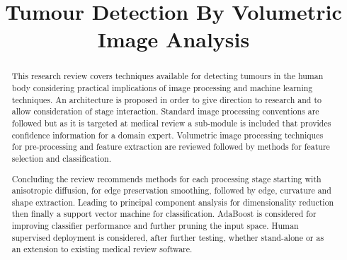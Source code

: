 \documentclass[journal]{IEEEtran}
\begin{document}
\title{Tumour Detection By Volumetric Image Analysis}
\author{
}


{}

\maketitle





\begin{abstract}

This research review covers techniques available for detecting tumours in the human body considering practical implications of image processing and machine learning techniques.   
An architecture is proposed in order to give direction to research and to allow consideration of stage interaction.
Standard image processing conventions are followed but as it is targeted at medical review a sub-module is included that provides confidence information for a domain expert.  
Volumetric image processing techniques for pre-processing and feature extraction are reviewed followed by methods for feature selection and classification. 
 

Concluding the review recommends methods for each processing stage starting with anisotropic diffusion, for edge preservation smoothing, followed by edge, curvature and shape extraction.
Leading to principal component analysis for dimensionality reduction then finally a support vector machine for classification.
AdaBoost is considered for improving classifier performance and further pruning the input space.
Human supervised deployment is considered, after further testing, whether stand-alone or as an extension to existing medical review software.

\end{abstract}







\end{document}
